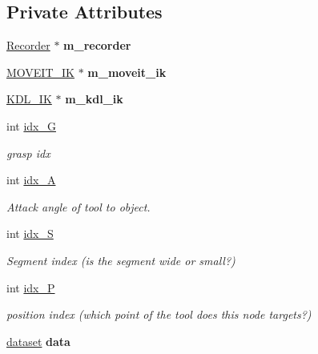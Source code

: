 \subsection*{Private Attributes}
\begin{DoxyCompactItemize}
\item 
\mbox{\label{classMCT__NODE_aef874e890b766463e4759fc4d35ae953}} 
\hyperlink{classRecorder}{Recorder} $\ast$ {\bfseries m\+\_\+recorder}
\item 
\mbox{\label{classMCT__NODE_a70703cea38d3318542b7273880d2dd85}} 
\hyperlink{classMOVEIT__IK}{M\+O\+V\+E\+I\+T\+\_\+\+IK} $\ast$ {\bfseries m\+\_\+moveit\+\_\+ik}
\item 
\mbox{\label{classMCT__NODE_aa4771b9891fc59ff0c760066e2744798}} 
\hyperlink{classKDL__IK}{K\+D\+L\+\_\+\+IK} $\ast$ {\bfseries m\+\_\+kdl\+\_\+ik}
\item 
\mbox{\label{classMCT__NODE_a6eb1d731da9167a081b3551059e01364}} 
int \hyperlink{classMCT__NODE_a6eb1d731da9167a081b3551059e01364}{idx\+\_\+G}
\begin{DoxyCompactList}\small\item\em grasp idx \end{DoxyCompactList}\item 
\mbox{\label{classMCT__NODE_a8584463b85cbb2d37e776e6b6b614333}} 
int \hyperlink{classMCT__NODE_a8584463b85cbb2d37e776e6b6b614333}{idx\+\_\+A}
\begin{DoxyCompactList}\small\item\em Attack angle of tool to object. \end{DoxyCompactList}\item 
\mbox{\label{classMCT__NODE_a09749a6c804a3abe443868bb952177e0}} 
int \hyperlink{classMCT__NODE_a09749a6c804a3abe443868bb952177e0}{idx\+\_\+S}
\begin{DoxyCompactList}\small\item\em Segment index (is the segment wide or small?) \end{DoxyCompactList}\item 
\mbox{\label{classMCT__NODE_a6796b0d15fdacaa0069ee9248dcb34db}} 
int \hyperlink{classMCT__NODE_a6796b0d15fdacaa0069ee9248dcb34db}{idx\+\_\+P}
\begin{DoxyCompactList}\small\item\em position index (which point of the tool does this node targets?) \end{DoxyCompactList}\item 
\mbox{\label{classMCT__NODE_a82a084c7ba13283b6162bdecbb892878}} 
\hyperlink{structdataset}{dataset} {\bfseries data}
\end{DoxyCompactItemize}


